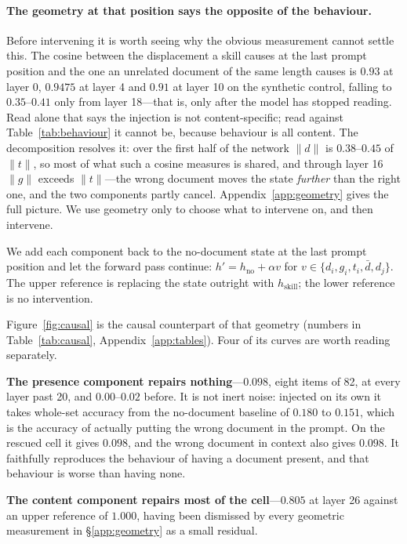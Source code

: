 \documentclass{article}
\newcommand{\dvec}{\ensuremath{d}}
\newcommand{\gvec}{\ensuremath{g}}
\newcommand{\tvec}{\ensuremath{t}}
\begin{document}
\paragraph{The geometry at that position says the opposite of the behaviour.}
Before intervening it is worth seeing why the obvious measurement cannot settle
this. The cosine between the displacement a skill causes at the last prompt
position and the one an unrelated document of the same length causes is $0.93$ at
layer 0, $0.9475$ at layer 4 and $0.91$ at layer 10 on the synthetic control,
falling to $0.35$--$0.41$ only from layer 18---that is, only after the model has
stopped reading. Read alone that says the injection is not content-specific;
read against Table~\ref{tab:behaviour} it cannot be, because behaviour is all
content. The decomposition resolves it: over the first half of the network
$\|\dvec\|$ is $0.38$--$0.45$ of $\|\tvec\|$, so most of what such a cosine
measures is shared, and through layer 16 $\|\gvec\|$ exceeds $\|\tvec\|$---the
wrong document moves the state \emph{further} than the right one, and the two
components partly cancel. Appendix~\ref{app:geometry} gives the full picture. We
use geometry only to choose what to intervene on, and then intervene.


We add each component back to the no-document state at the last prompt position
and let the forward pass continue: $h' = h_{\text{no}} + \alpha v$ for
$v \in \{\dvec_i, \gvec_i, \tvec_i, \bar{\dvec}, \dvec_j\}$. The upper reference
is replacing the state outright with $h_{\text{skill}}$; the lower reference is
no intervention.




Figure~\ref{fig:causal} is the causal counterpart of that geometry (numbers in
Table~\ref{tab:causal}, Appendix~\ref{app:tables}). Four of its curves are worth
reading separately.

\textbf{The presence component repairs nothing}---$0.098$, eight items of 82, at
every layer past 20, and $0.00$--$0.02$ before. It is not inert noise: injected
on its own it takes whole-set accuracy from the no-document baseline of $0.180$
to $0.151$, which is the accuracy of actually putting the wrong document in the
prompt. On the rescued cell it gives $0.098$, and the wrong document in context
also gives $0.098$. It faithfully reproduces the behaviour of having a document
present, and that behaviour is worse than having none.

\textbf{The content component repairs most of the cell}---$0.805$ at layer 26
against an upper reference of $1.000$, having been dismissed by every geometric
measurement in \S\ref{app:geometry} as a small residual.
\end{document}
